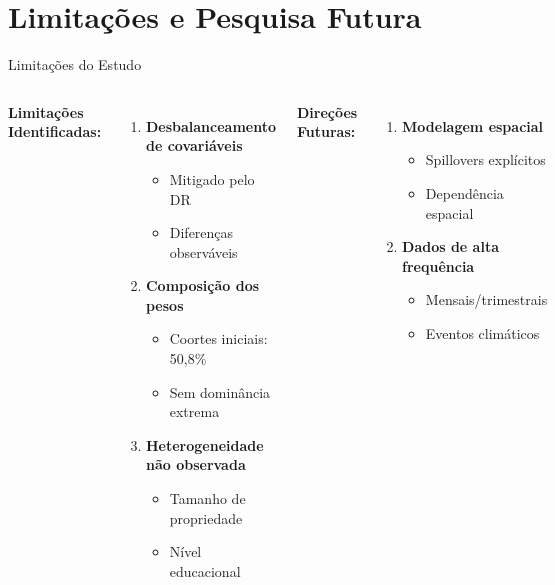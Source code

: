 \documentclass[10pt,aspectratio=169]{beamer}
\begin{document}
\section{Limitações e Pesquisa Futura}

\begin{frame}{Limitações do Estudo}
\begin{columns}
\textbf{Limitações Identificadas:}
\begin{enumerate}
    \item \textbf{Desbalanceamento de covariáveis}
    \begin{itemize}
        \item Mitigado pelo DR
        \item Diferenças observáveis
    \end{itemize}
    
    \item \textbf{Composição dos pesos}
    \begin{itemize}
        \item Coortes iniciais: 50,8\%
        \item Sem dominância extrema
    \end{itemize}
    
    \item \textbf{Heterogeneidade não observada}
    \begin{itemize}
        \item Tamanho de propriedade
        \item Nível educacional
    \end{itemize}
\end{enumerate}

\textbf{Direções Futuras:}
\begin{enumerate}
    \item \textbf{Modelagem espacial}
    \begin{itemize}
        \item Spillovers explícitos
        \item Dependência espacial
    \end{itemize}
    
    \item \textbf{Dados de alta frequência}
    \begin{itemize}
        \item Mensais/trimestrais
        \item Eventos climáticos
    \end{itemize}
    

\end{enumerate}
\end{columns}
\end{frame}
\end{document}
